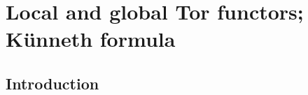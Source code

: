 \section{Local and global Tor functors; K\"unneth formula}
\label{section:III.6}


\subsection{Introduction}
\label{subsection:III.6.1}


















